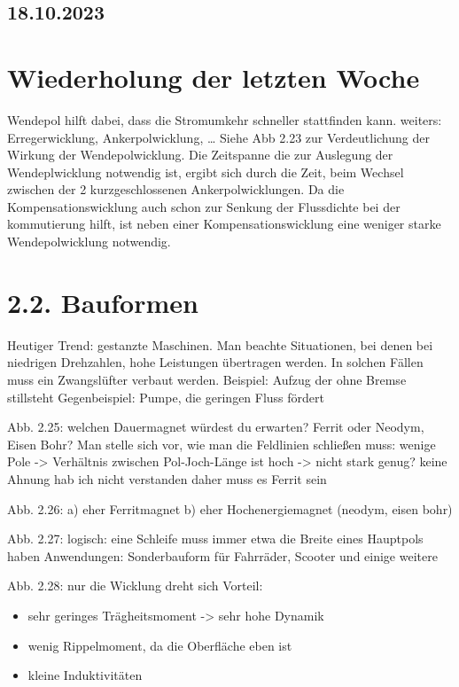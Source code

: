 \documentclass[a4paper]{article}
\begin{document}
\subsection*{18.10.2023}

\section*{Wiederholung der letzten Woche}
Wendepol hilft dabei, dass die Stromumkehr schneller stattfinden kann.
weiters: Erregerwicklung, Ankerpolwicklung, \ldots\newline
Siehe Abb 2.23 zur Verdeutlichung der Wirkung  der Wendepolwicklung.
Die Zeitspanne die zur Auslegung der Wendeplwicklung notwendig ist, ergibt sich durch die Zeit, beim Wechsel zwischen der 2 kurzgeschlossenen Ankerpolwicklungen.
Da die Kompensationswicklung auch schon zur Senkung der Flussdichte bei der kommutierung hilft, ist neben einer Kompensationswicklung eine weniger starke Wendepolwicklung notwendig.
\section*{2.2. Bauformen}
Heutiger Trend: gestanzte Maschinen. 
Man beachte Situationen, bei denen bei niedrigen Drehzahlen, hohe Leistungen übertragen werden.
In solchen Fällen muss ein Zwangslüfter verbaut werden.
Beispiel: Aufzug der ohne Bremse stillsteht
Gegenbeispiel: Pumpe, die geringen Fluss fördert

Abb. 2.25: welchen Dauermagnet würdest du erwarten? Ferrit oder Neodym, Eisen Bohr?
Man stelle sich vor, wie man die Feldlinien schließen muss:
    wenige Pole -> Verhältnis zwischen Pol-Joch-Länge ist hoch -> nicht stark genug? keine Ahnung hab ich nicht verstanden
daher muss es Ferrit sein

Abb. 2.26: a) eher Ferritmagnet b) eher Hochenergiemagnet (neodym, eisen bohr)

Abb. 2.27: logisch: eine Schleife muss immer etwa die Breite eines Hauptpols haben
Anwendungen: Sonderbauform für Fahrräder, Scooter und einige weitere

Abb. 2.28: nur die Wicklung dreht sich
Vorteil:
\begin{itemize}
\item sehr geringes Trägheitsmoment -> sehr hohe Dynamik
\item wenig Rippelmoment, da die Oberfläche eben ist
\item kleine Induktivitäten
\end{itemize}
\end{document}
